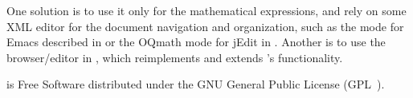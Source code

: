 \begin{omgroup}[id=qmath,short=QMath Parser,creators=alberto]
One solution is to use it only for the mathematical expressions, and rely on some XML
editor for the document navigation and organization, such as the {\omdoc} mode for Emacs
described in {} or the {\sc OQmath} mode for {\sc jEdit} in
{}.  Another is to use the {} browser/editor in
{}, which reimplements and extends {\qmath}'s functionality.

{\qmath} is Free Software distributed under the GNU General Public License (GPL~\cite{GPL}).
\end{omgroup}


